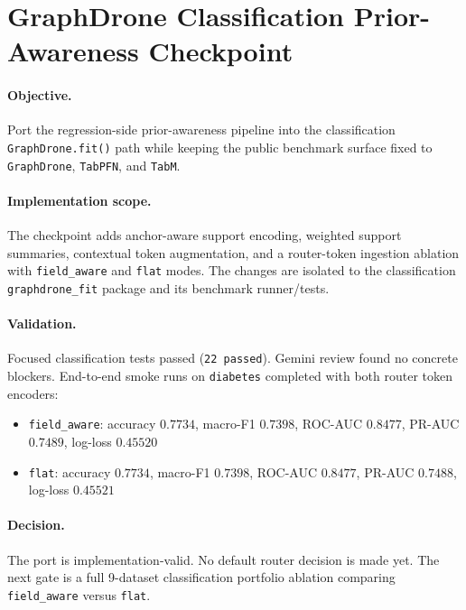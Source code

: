 \section{GraphDrone Classification Prior-Awareness Checkpoint}

\paragraph{Objective.}
Port the regression-side prior-awareness pipeline into the classification
\texttt{GraphDrone.fit()} path while keeping the public benchmark surface fixed
to \texttt{GraphDrone}, \texttt{TabPFN}, and \texttt{TabM}.

\paragraph{Implementation scope.}
The checkpoint adds anchor-aware support encoding, weighted support summaries,
contextual token augmentation, and a router-token ingestion ablation with
\texttt{field\_aware} and \texttt{flat} modes. The changes are isolated to the
classification \texttt{graphdrone\_fit} package and its benchmark runner/tests.

\paragraph{Validation.}
Focused classification tests passed (\texttt{22 passed}). Gemini review found no
concrete blockers. End-to-end smoke runs on \texttt{diabetes} completed with
both router token encoders:
\begin{itemize}
\item \texttt{field\_aware}: accuracy $0.7734$, macro-F1 $0.7398$, ROC-AUC $0.8477$, PR-AUC $0.7489$, log-loss $0.45520$
\item \texttt{flat}: accuracy $0.7734$, macro-F1 $0.7398$, ROC-AUC $0.8477$, PR-AUC $0.7488$, log-loss $0.45521$
\end{itemize}

\paragraph{Decision.}
The port is implementation-valid. No default router decision is made yet. The
next gate is a full 9-dataset classification portfolio ablation comparing
\texttt{field\_aware} versus \texttt{flat}.

